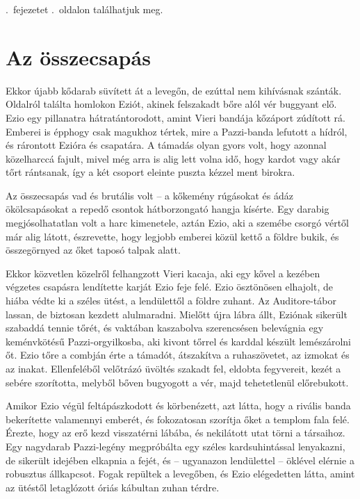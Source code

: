 \documentclass[12pt, a4paper, twoside]{report}
\theoremstyle{definition}
\theoremstyle{remark}
\begin{document}
\Az{\ref{2-fej}}.~fejezetet \az{\pageref{2-fej}}.~oldalon találhatjuk meg.

\section{Az összecsapás}
Ekkor  újabb  kődarab  süvített  át  a  levegőn,  de  ezúttal  nem 
kihívásnak  szánták.  Oldalról  találta  homlokon  Eziót,  akinek 
felszakadt  bőre  alól  vér  buggyant  elő.  Ezio  egy  pillanatra 
hátratántorodott, amint Vieri bandája kőzáport zúdított rá. Emberei is 
épphogy csak magukhoz tértek, mire a Pazzi-banda lefutott a hídról, 
és rárontott Ezióra és csapatára. A támadás olyan gyors volt, hogy 
azonnal közelharccá fajult, mivel még arra is alig lett volna idő, hogy 
kardot  vagy  akár  tőrt  rántsanak,  így  a  két  csoport  eleinte  puszta kézzel ment birokra. 

Az összecsapás vad és brutális volt -- a kőkemény rúgásokat és 
ádáz ökölcsapásokat a repedő csontok hátborzongató hangja kísérte. 
Egy darabig megjósolhatatlan volt a harc kimenetele, aztán Ezio, aki 
a  szemébe  csorgó  vértől  már  alig  látott,  észrevette,  hogy  legjobb emberei közül kettő a földre bukik, és összegörnyed az őket taposó talpak alatt. 

Ekkor közvetlen közelről felhangzott Vieri kacaja, aki 
egy kővel a kezében végzetes csapásra lendítette karját Ezio feje felé. 
Ezio  ösztönösen  elhajolt,  de  hiába  védte  ki  a  széles  ütést,  a 
lendülettől  a  földre  zuhant.  Az  Auditore-tábor  lassan,  de  biztosan kezdett  alulmaradni.  Mielőtt  újra  lábra  állt,  Eziónak  sikerült szabaddá  tennie  tőrét,  és  vaktában  kaszabolva  szerencsésen 
belevágnia egy keménvkötésű Pazzi-orgyilkosba, aki kivont tőrrel és 
karddal készült lemészárolni őt. Ezio tőre a combján érte a támadót, 
átszakítva  a  ruhaszövetet,  az  izmokat  és  az  inakat.  Ellenfeléből 
velőtrázó  üvöltés  szakadt  fel,  eldobta  fegyvereit,  kezét  a  sebére 
szorította,  melyből  bőven  bugyogott  a  vér,  majd  tehetetlenül előrebukott.

Amikor Ezio végül feltápászkodott és körbenézett, azt látta, hogy a 
rivális banda bekerítette valamennyi emberét, és fokozatosan szorítja 
őket a templom fala felé. Érezte, hogy az erő kezd visszatérni lábába, 
és  nekilátott  utat  törni  a  társaihoz.  Egy  nagydarab  Pazzi-legény 
megpróbálta  egy  széles  kardsuhintással  lenyakazni,  de  sikerült 
idejében elkapnia a fejét, és -- ugyanazon lendülettel -- öklével elérnie 
a  robusztus  állkapcsot.  Fogak  repültek  a  levegőben,  és  Ezio 
elégedetten látta, amint az ütéstől letaglózott óriás kábultan zuhan 
térdre.  
\end{document}
